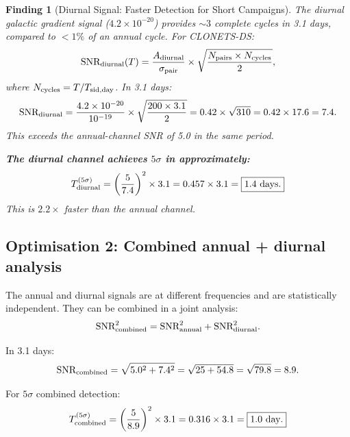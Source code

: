 \documentclass[11pt]{article}
\newtheorem{finding}{Finding}
\newcommand{\ee}[1]{\times 10^{#1}}
\begin{document}
\begin{finding}[Diurnal Signal: Faster Detection for Short Campaigns]
\label{find:diurnal-fast}
The diurnal galactic gradient signal ($4.2\ee{-20}$) provides
$\sim 3$ complete cycles in 3.1 days, compared to $< 1\%$ of an annual
cycle. For CLONETS-DS:
\begin{equation}
\text{SNR}_{\rm diurnal}(T) = \frac{A_{\rm diurnal}}{\sigma_{\rm pair}}
\times\sqrt{\frac{N_{\rm pairs}\times N_{\rm cycles}}{2}},
\end{equation}
where $N_{\rm cycles} = T/T_{\rm sid,day}$. In 3.1 days:
\begin{equation}
\text{SNR}_{\rm diurnal} = \frac{4.2\ee{-20}}{10^{-19}}
\times\sqrt{\frac{200\times 3.1}{2}}
= 0.42\times\sqrt{310} = 0.42\times 17.6 = 7.4.
\end{equation}
This exceeds the annual-channel SNR of 5.0 in the same period.

\textbf{The diurnal channel achieves $5\sigma$ in approximately:}
\begin{equation}
T^{(5\sigma)}_{\rm diurnal} = \left(\frac{5}{7.4}\right)^2\times 3.1
= 0.457\times 3.1 = \boxed{1.4~\text{days}.}
\end{equation}
This is $2.2\times$ faster than the annual channel.
\end{finding}

\subsection{Optimisation 2: Combined annual + diurnal analysis}

The annual and diurnal signals are at different frequencies and are
statistically independent. They can be combined in a joint analysis:
\begin{equation}
\text{SNR}_{\rm combined}^2 = \text{SNR}_{\rm annual}^2 + \text{SNR}_{\rm diurnal}^2.
\label{eq:SNR-combined}
\end{equation}

In 3.1 days:
\begin{equation}
\text{SNR}_{\rm combined} = \sqrt{5.0^2 + 7.4^2} = \sqrt{25 + 54.8}
= \sqrt{79.8} = 8.9.
\end{equation}

For $5\sigma$ combined detection:
\begin{equation}
T^{(5\sigma)}_{\rm combined} = \left(\frac{5}{8.9}\right)^2\times 3.1
= 0.316\times 3.1 = \boxed{1.0~\text{day}.}
\end{equation}
\end{document}
